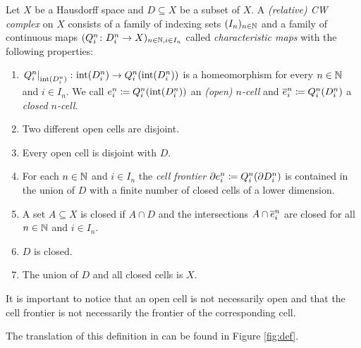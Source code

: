 \begin{defi}\label{def:cwcomplex}
    Let $X$ be a Hausdorff space and $D \subseteq X$ be a subset of $X$. 
    A \emph{(relative) CW complex} on $X$ consists of a family of indexing sets $(I_n)_{n \in \bN}$ and a family of continuous maps $(Q_i^n \colon D_i^n \to X)_{n \in \bN, i \in I_n}$ called \emph{characteristic maps} with the following properties: 
    \begin{enumerate}
        \item $\restrict{Q_i^n}{\interior{D_i^n}} \colon \interior{D_i^n} \to Q_i^n(\interior{D_i^n})$ is a homeomorphism for every $n \in \bN$ and $i \in I_n$. We call $\openCell{n}{i} \coloneq Q_i^n(\interior{D_i^n})$ an \emph{(open) $n$-cell} and $\closedCell{n}{i} \coloneq Q_i^n(D_i^n)$ a \emph{closed $n$-cell}.
        \item Two different open cells are disjoint.
        \item Every open cell is disjoint with $D$.
        \item For each $n \in \bN$ and $i \in I_n$ the \emph{cell frontier} $\cellFrontier{n}{i} \coloneq Q_i^n(\boundary D_i^n)$ is contained in the union of $D$ with a finite number of closed cells of a lower dimension.
        \item A set $A \subseteq X$ is closed if $A \cap D$ and the intersections $A \cap \closedCell{n}{i}$ are closed for all $n \in \bN$ and $i \in I_n$.
        \item $D$ is closed. 
        \item The union of $D$ and all closed cells is $X$.
    \end{enumerate}
\end{defi}

It is important to notice that an open cell is not necessarily open and that the cell frontier is not necessarily the frontier of the corresponding cell.

The translation of this definition in \mathlib can be found in Figure \ref{fig:def}.


